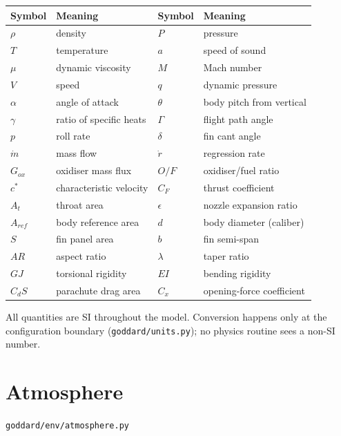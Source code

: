 \documentclass[11pt,a4paper]{article}
\newcommand{\src}[1]{\hfill{\footnotesize\texttt{#1}}}
\begin{document}
\begin{center}
\begin{tabular}{@{}llll@{}}
\toprule
Symbol & Meaning & Symbol & Meaning \\
\midrule
$\rho$      & density                    & $P$        & pressure \\
$T$         & temperature                & $a$        & speed of sound \\
$\mu$       & dynamic viscosity          & $M$        & Mach number \\
$V$         & speed                      & $q$        & dynamic pressure \\
$\alpha$    & angle of attack            & $\theta$   & body pitch from vertical \\
$\gamma$    & ratio of specific heats    & $\Gamma$   & flight path angle \\
$p$         & roll rate                  & $\delta$   & fin cant angle \\
$\dot m$    & mass flow                  & $\dot r$   & regression rate \\
$G_{ox}$    & oxidiser mass flux         & $O\!/\!F$  & oxidiser/fuel ratio \\
$c^*$       & characteristic velocity    & $C_F$      & thrust coefficient \\
$A_t$       & throat area                & $\epsilon$ & nozzle expansion ratio \\
$A_{ref}$   & body reference area        & $d$        & body diameter (caliber) \\
$S$         & fin panel area             & $b$        & fin semi-span \\
$AR$        & aspect ratio               & $\lambda$  & taper ratio \\
$GJ$        & torsional rigidity         & $EI$       & bending rigidity \\
$C_dS$      & parachute drag area        & $C_x$      & opening-force coefficient \\
\bottomrule
\end{tabular}
\end{center}

\noindent
All quantities are SI throughout the model. Conversion happens only at the
configuration boundary (\texttt{goddard/units.py}); no physics routine sees a
non-SI number.

\section{Atmosphere}
\src{goddard/env/atmosphere.py}
\end{document}
